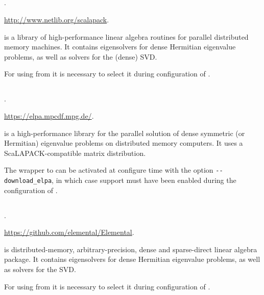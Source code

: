 \subsection*{\underline{\scalapack}}
	\begin{description}
	\setlength{\itemsep}{0pt}
	\item[References.]\citep{Blackford:1997:SUG}.
	\item[Website.] \url{http://www.netlib.org/scalapack}.
	\item[Summary.] \scalapack is a library of high-performance linear algebra routines for parallel distributed memory machines. It contains eigensolvers for dense Hermitian eigenvalue problems, as well as solvers for the (dense) SVD.
	\item[Installation.] For using \scalapack from \slepc it is necessary to select it during configuration of \petsc.
	\end{description}

\subsection*{\underline{\elpa}}
	\begin{description}
	\setlength{\itemsep}{0pt}
	\item[References.]\citep{Auckenthaler:2011:ELP}.
	\item[Website.] \url{https://elpa.mpcdf.mpg.de/}.
	\item[Summary.] \elpa is a high-performance library for the parallel solution of dense symmetric (or Hermitian) eigenvalue problems on distributed memory computers. It uses a ScaLAPACK-compatible matrix distribution.
	\item[Installation.] The \slepc wrapper to \elpa can be activated at configure time with the option \texttt{-{}-download\_elpa}, in which case \scalapack support must have been enabled during the configuration of \petsc.
	\end{description}

\subsection*{\underline{\elemental}}
	\begin{description}
	\setlength{\itemsep}{0pt}
	\item[References.]\citep{Poulson:2013:ELE}.
	\item[Website.] \url{https://github.com/elemental/Elemental}.
	\item[Summary.] \elemental is distributed-memory, arbitrary-precision, dense and sparse-direct linear algebra package. It contains eigensolvers for dense Hermitian eigenvalue problems, as well as solvers for the SVD.
	\item[Installation.] For using \elemental from \slepc it is necessary to select it during configuration of \petsc.
	\end{description}

